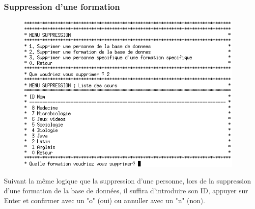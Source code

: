 \documentclass[11pt]{article}
\begin{document}
\newpage
\subsubsection{Suppression d'une formation}
\begin{figure}[ht]
  \centering
  \includegraphics[trim=0 0 0 10, clip, scale=0.8]{images/18.png.png}
\end{figure}
Suivant la même logique que la suppression d'une personne, lors de la suppression d'une formation de la base de données, il suffira d'introduire son ID, appuyer sur Enter et confirmer avec un "o" (oui) ou annuller avec un "n" (non). 

\newpage
\end{document}
